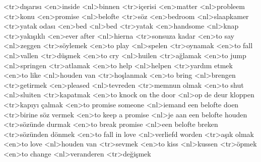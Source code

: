 <tr>dışarısı
<en>inside
<nl>binnen
<tr>içerisi
<en>matter
<nl>probleem
<tr>konu
<en>promise
<nl>belofte
<tr>söz
<en>bedroom
<nl>slaapkamer
<tr>yatak odası
<en>bed
<nl>bed
<tr>yatak
<en>handsome
<nl>knap
<tr>yakışıklı
<en>ever after
<nl>hierna
<tr>sonsuza kadar
<en>to say
<nl>zeggen
<tr>söylemek
<en>to play
<nl>spelen
<tr>oynamak
<en>to fall
<nl>vallen
<tr>düşmek
<en>to cry
<nl>huilen
<tr>ağlamak
<en>to jump
<nl>springen
<tr>atlamak
<en>to help
<nl>helpen
<tr>yardım etmek
<en>to like
<nl>houden van
<tr>hoşlanmak
<en>to bring
<nl>brengen
<tr>getirmek
<en>pleased
<nl>tevreden
<tr>memnun olmak
<en>to shut
<nl>sluiten
<tr>kapatmak
<en>to knock on the door
<nl>op de deur kloppen
<tr>kapıyı çalmak
<en>to promise someone
<nl>iemand een belofte doen
<tr>birine söz vermek
<en>to keep a promise
<nl>je aan een belofte houden
<tr>sözünde durmak
<en>to break promise
<nl>een belofte breken
<tr>sözünden dönmek
<en>to fall in love
<nl>verliefd worden
<tr>aşık olmak
<en>to love
<nl>houden van
<tr>sevmek
<en>to kiss
<nl>kussen
<tr>öpmek
<en>to change
<nl>veranderen
<tr>değişmek
